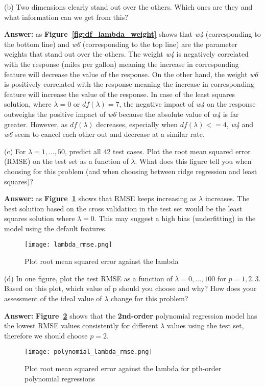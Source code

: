 \documentclass[11pt]{report}
\begin{document}
\justify
(b) Two dimensions clearly stand out over the others. Which ones are they and what information can
we get from this?

\justify
\textbf{Answer:} as \textbf{Figure~\ref{fig:df_lambda_weight}} shows that \emph{w4} (corresponding to the bottom line) and \emph{w6} (corresponding to the top line) are the parameter weights that stand out over the others. The weight \emph{w4} is negatively correlated with the response (miles per gallon) meaning the increase in corresponding feature will decrease the value of the response. On the other hand, the weight \emph{w6} is positively correlated with the response meaning the increase in corresponding feature will increase the value of the response. In case of the least squares solution, where $\lambda=0$ or $df(\lambda) = 7$,  the negative impact of \emph{w4}  on the response outweighs the positive impact of \emph{w6} because the absolute value of \emph{w4} is far greater. However, as $df(\lambda)$ decreases, especially when $df(\lambda) <= 4$,  \emph{w4} and \emph{w6} seem to cancel each other out and decrease at a similar rate.

\justify
(c) For $\lambda = 1, ..., 50$, predict all 42 test cases. Plot the root mean squared error (RMSE) on the test set as a function of $\lambda$. What does this figure tell you when choosing for this problem (and when choosing between ridge regression and least squares)?

\justify
\textbf{Answer:} as \textbf{Figure~\ref{fig:ambda_rmse}} shows that RMSE keeps increasing as $\lambda$ increases. The best solution based on the cross validation in the test set would be the least squares solution where $\lambda = 0$. This may suggest a high bias (underfitting) in the model using the default features. 


\begin{figure}[h]
\texttt{[image: lambda\_rmse.png]}
\centering
\caption{Plot root mean squared error against the lambda}
\label{fig:ambda_rmse}
\end{figure}


\justify
(d) In one figure, plot the test RMSE as a function of $\lambda = 0, . . . , 100$ for $ p = 1,  2, 3$. Based on this plot, which value of p should you choose and why? How does your assessment of the ideal value of $\lambda$ change for this problem?

\justify
\textbf{Answer:}  \textbf{Figure~\ref{fig:polynomial_lambda_rmse}} shows that the \textbf{2nd-order} polynomial regression model has the lowest RMSE values consistently for different $\lambda$ values using the test set, therefore we should choose $p=2$.  

\begin{figure}[h]
\texttt{[image: polynomial\_lambda\_rmse.png]}
\centering
\caption{Plot root mean squared error against the lambda for pth-order polynomial regressions}
\label{fig:polynomial_lambda_rmse}
\end{figure}
\end{document}
